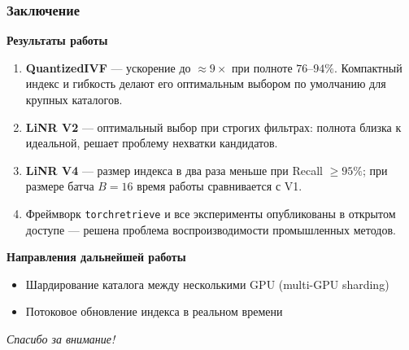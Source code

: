 \documentclass[aspectratio=169,9pt]{beamer}
\begin{document}
\begin{frame}
\frametitle{Заключение}

\textbf{Результаты работы}
\begin{enumerate}
  \item \textbf{QuantizedIVF} --- ускорение до ${\approx}9\times$
        при полноте $76$--$94\%$. Компактный индекс и гибкость делают его оптимальным выбором по умолчанию
        для крупных каталогов.
  \item \textbf{LiNR V2} --- оптимальный выбор при строгих фильтрах:
        полнота близка к идеальной, решает проблему нехватки кандидатов.
  \item \textbf{LiNR V4} --- размер индекса в два раза меньше при Recall $\ge 95\%$;
        при размере батча $B=16$ время работы сравнивается с V1.
  \item Фреймворк \texttt{torchretrieve} и все эксперименты опубликованы в открытом доступе ---
        решена проблема воспроизводимости промышленных методов.
\end{enumerate}

\vspace{0.4em}
\textbf{Направления дальнейшей работы}
\begin{itemize}\small
  \item Шардирование каталога между несколькими GPU (multi-GPU sharding)
  \item Потоковое обновление индекса в реальном времени
\end{itemize}
\end{frame}

\begin{frame}[plain]
\begin{center}
  \vfill
  {\LARGE\textit{Спасибо за внимание!}}
  \vfill
\end{center}
\end{frame}
\end{document}
